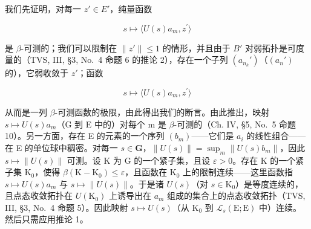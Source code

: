 我们先证明，对每一 \(z' \in E'\)，纯量函数

\[
s \mapsto \langle U (s) a _ {m}, z ^ {\prime} \rangle
\]

是 \(\beta\)-可测的；我们可以限制在 \(\|z'\| \leqslant 1\) 的情形，并且由于 \(B'\) 对弱拓扑是可度量的（TVS, III, §3, No.~4 命题 6 的推论 2），存在一个子列 \((a_{n_k}')\)（\((a_n')\) 的），它弱收敛于 \(z'\)；函数

\[
s \mapsto \langle U (s) a _ {m}, z ^ {\prime} \rangle
\]

从而是一列 \(\beta\)-可测函数的极限，由此得出我们的断言。由此推出，映射 \(s \mapsto U(s)a_{m}\)（G 到 E 中的）对每个 m 是 \(\beta\)-可测的（Ch. IV, §5, No.~5 命题 10）。另一方面，存在 E 的元素的一个序列 \((b_{m})\)——它们是 \(a_{i}\) 的线性组合——在 E 的单位球中稠密。对每一 \(s \in \mathbf{G}\)，\(\|U(s)\| = \sup_{m} \|U(s)b_{m}\|\)，因此 \(s \mapsto \|U(s)\|\) 可测。设 K 为 G 的一个紧子集，且设 \(\varepsilon > 0\)。存在 K 的一个紧子集 \(\mathrm{K}_{0}\)，使得 \(\beta(\mathrm{K} - \mathrm{K}_{0}) \leqslant \varepsilon\)，且函数在 \(\mathrm{K}_{0}\) 上的限制连续——这里函数指 \(s \mapsto U(s)a_{m}\) 与 \(s \mapsto \|U(s)\|\)。于是诸 \(U(s)\)（对 \(s \in \mathrm{K}_{0}\)）是等度连续的，且点态收敛拓扑在 \(U(\mathrm{K}_{0})\) 上诱导出在 \(a_{m}\) 组成的集合上的点态收敛拓扑（TVS, III, §3, No.~4 命题 5）。因此映射 \(s \mapsto U(s)\)（从 \(\mathrm{K}_{0}\) 到 \(\mathcal{L}_{s}(\mathrm{E};\mathrm{E})\) 中）连续。然后只需应用推论 1。

